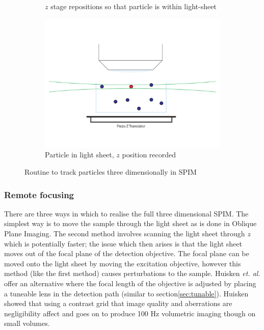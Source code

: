 \begin{figure}
\begin{subfigure}[b]{0.35\linewidth}
		\caption{\(z\) stage repositions so that particle is within light-sheet}
		\label{fig:SPIMSPT3}
	\end{subfigure}
	\begin{subfigure}[b]{0.35\linewidth}
		\centering
		\includegraphics[width=0.8\linewidth]{Chapters/spt/Figs/PDF/tracking/4_piezo_track}
		\caption{Particle in light sheet, \(z\) position recorded}
		\label{fig:SPIMSPT4}
	\end{subfigure}
	\caption{Routine to track particles three dimensionally in SPIM}
	\label{fig:SPIMSPT}
\end{figure}

\subsubsection{Remote focusing}

There are three ways in which to realise the full three dimensional SPIM.
The simplest way is to move the sample through the light sheet as is done in Oblique Plane Imaging.
The second method involves scanning the light sheet through \textit{z} which is potentially faster; the issue which then arises is that the light sheet moves out of the focal plane of the detection objective.
The focal plane can be moved onto the light sheet by moving the excitation objective, however this method (like the first method) causes perturbations to the sample.
Huisken \emph{et. al.} offer an alternative where the focal length of the objective is adjusted by placing a tuneable lens in the detection path (similar to section\ref{sec:tunable})\cite{Fahrbach2013}.
Huisken showed that using a contrast grid that image quality and aberrations are negligibility affect and goes on to produce 100 Hz volumetric imaging though on small volumes\cite{Fahrbach2013}.

